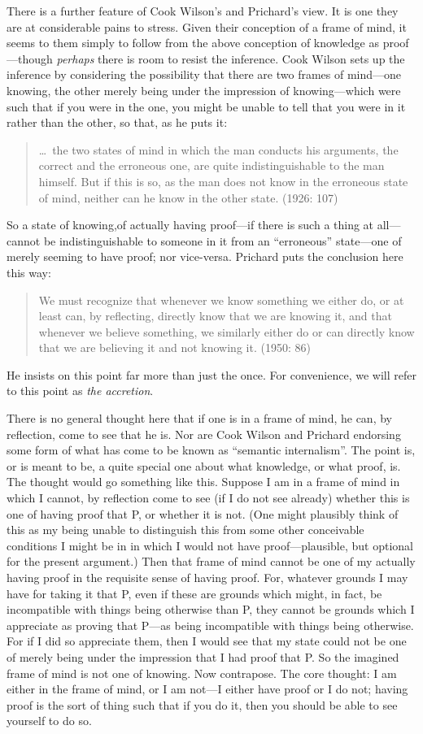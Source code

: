 There is a further feature of Cook Wilson’s and Prichard’s view. It is one they are at considerable pains to stress. Given their conception of a frame of mind, it seems to them simply to follow from the above conception of knowledge as proof---though \emph{perhaps} there is room to resist the inference. Cook Wilson sets up the inference by considering the possibility that there are two frames of mind---one knowing, the other merely being under the impression of knowing---which were such that if you were in the one, you might be unable to tell that you were in it rather than the other, so that, as he puts it:
\begin{quote}
	\ldots\ the two states of mind in which the man conducts his arguments, the correct and the erroneous one, are quite indistinguishable to the man himself. But if this is so, as the man does not know in the erroneous state of mind, neither can he know in the other state. (1926: 107)
\end{quote}
So a state of knowing,of actually having proof---if there is such a thing at all---cannot be indistinguishable to someone in it from an ``erroneous'' state---one of merely seeming to have proof; nor vice-versa. Prichard puts the conclusion here this way:
\begin{quote}
	We must recognize that whenever we know something we either do, or at least can, by reflecting, directly know that we are knowing it, and that whenever we believe something, we similarly either do or can directly know that we are believing it and not knowing it. (1950: 86)
\end{quote}
He insists on this point far more than just the once. For convenience, we will refer to this point as \emph{the accretion}.

There is no general thought here that if one is in a frame of mind, he can, by reflection, come to see that he is. Nor are Cook Wilson and Prichard endorsing some form of what has come to be known as ``semantic internalism''. The point is, or is meant to be, a quite special one about what knowledge, or what proof, is. The thought would go something like this. Suppose I am in a frame of mind in which I cannot, by reflection come to see (if I do not see already) whether this is one of having proof that P, or whether it is not. (One might plausibly think of this as my being unable to distinguish this from some other conceivable conditions I might be in in which I would not have proof---plausible, but optional for the present argument.) Then that frame of mind cannot be one of my actually having proof in the requisite sense of having proof. For, whatever grounds I may have for taking it that P, even if these are grounds which might, in fact, be incompatible with things being otherwise than P, they cannot be grounds which I appreciate as proving that P---as being incompatible with things being otherwise. For if I did so appreciate them, then I would see that my state could not be one of merely being under the impression that I had proof that P. So the imagined frame of mind is not one of knowing. Now contrapose. The core thought: I am either in the frame of mind, or I am not---I either have proof or I do not; having proof is the sort of thing such that if you do it, then you should be able to see yourself to do so.

